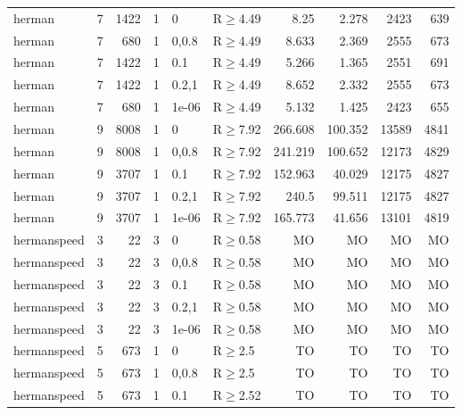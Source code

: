 \begin{longtable}{llrrllrrrr}
 herman        & 7        &   	1422 &   1 & 0     & R$\geq$4.49  & 8.25     & 2.278   & 2423    & 639     \\
 herman        & 7        &    	680 &   1 & 0,0.8 & R$\geq$4.49  & 8.633    & 2.369   & 2555    & 673     \\
 herman        & 7        &   	1422 &   1 & 0.1   & R$\geq$4.49  & 5.266    & 1.365   & 2551    & 691     \\
 herman        & 7        &   	1422 &   1 & 0.2,1 & R$\geq$4.49  & 8.652    & 2.332   & 2555    & 673     \\
 herman        & 7        &    	680 &   1 & 1e-06 & R$\geq$4.49  & 5.132    & 1.425   & 2423    & 655     \\
 herman        & 9        &   	8008 &   1 & 0     & R$\geq$7.92  & 266.608  & 100.352 & 13589   & 4841    \\
 herman        & 9        &   	8008 &   1 & 0,0.8 & R$\geq$7.92  & 241.219  & 100.652 & 12173   & 4829    \\
 herman        & 9        &   	3707 &   1 & 0.1   & R$\geq$7.92  & 152.963  & 40.029  & 12175   & 4827    \\
 herman        & 9        &   	3707 &   1 & 0.2,1 & R$\geq$7.92  & 240.5    & 99.511  & 12175   & 4827    \\
 herman        & 9        &   	3707 &   1 & 1e-06 & R$\geq$7.92  & 165.773  & 41.656  & 13101   & 4819    \\
 hermanspeed   & 3        &     	22 &   3 & 0     & R$\geq$0.58  & MO       & MO      & MO      & MO      \\
 hermanspeed   & 3        &     	22 &   3 & 0,0.8 & R$\geq$0.58  & MO       & MO      & MO      & MO      \\
 hermanspeed   & 3        &     	22 &   3 & 0.1   & R$\geq$0.58  & MO       & MO      & MO      & MO      \\
 hermanspeed   & 3        &     	22 &   3 & 0.2,1 & R$\geq$0.58  & MO       & MO      & MO      & MO      \\
 hermanspeed   & 3        &     	22 &   3 & 1e-06 & R$\geq$0.58  & MO       & MO      & MO      & MO      \\
 hermanspeed   & 5        &    	673 &   1 & 0     & R$\geq$2.5   & TO       & TO      & TO      & TO      \\
 hermanspeed   & 5        &    	673 &   1 & 0,0.8 & R$\geq$2.5   & TO       & TO      & TO      & TO      \\
 hermanspeed   & 5        &    	673 &   1 & 0.1   & R$\geq$2.52  & TO       & TO      & TO      & TO      \\

\end{longtable}
